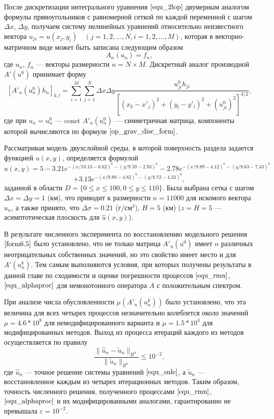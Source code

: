 После дискретизации интегрального уравнения $\eqref{equ_2lop}$ двумерным аналогом формулы прямоугольников с равномерной сеткой по каждой переменной с шагом $\Delta x$, $\Delta y$, получаем систему нелинейных уравнений относительно неизвестного вектора $u_{ji}=u(x_j,y_i)\quad (j=1,2,...,N, i=1,2,...,M)$, которая в векторно-матричном виде может быть записана следующим образом
\begin{equation}\label{equ_snle}
	A_n(u_n)=f_n,
\end{equation}
где $u_n$, $f_n$ --- векторы размерности $n=N\times M$. Дискретный аналог производной $A'(u^0)$ принимает форму
\begin{equation}\label{op_grav_disc_form}
	[A'_n(u_n^0)h_n]_{k,l}=\sum\limits_{i=1}^{M}\sum\limits_{j=1}^{N}
	\Delta x\Delta y\frac{u^0_{ji}h_{ji}}{[(x_k-x'_j)^2+(y_l-y'_i)^2+(u^0_{ji})^2]^{3/2}},
\end{equation}
где при $u_n=u_{n}^{0}$ --- const $A'_n(u_n^0)$ --- симметричная матрица, компоненты которой вычисляются по формуле $\eqref{op_grav_disc_form}$.

Рассматривая модель двухслойной среды, в которой поверхность раздела задается функцией $u(x,y)$, определяется формулой \cite{AkMisSkurTre2015_1}
$$
\hat{u}(x,y)=5-3.21e^{-(x/10.13-6.62)^6-(y/9.59-2.93)^6}-
2.78e^{-(x/9.89-4.12)^6-(y/8.63-7.43)^6}$$
\begin{equation}\label{form6.5}
+3.13e^{-(x/9.89-4.82)^6-(y/8.72-4.33)^6},
\end{equation}
заданной в области $D=\{0\le x\le 100, 0\le y \le 110\}$. Была выбрана сетка с шагом $\Delta x=\Delta y=1$ (км), что приводит к размерности $n=11000$ для искомого вектора $u_n$, а также принято, что $\Delta\sigma=0.21$ (г/см$^3$), $H=5$ (км) ($z=H=5$ --- асимптотическая плоскость для $\hat{u}(x,y)$).

В результате численного эксперимента по восстановлению модельного решения $\eqref{form6.5}$ было установлено, что не только матрица $A'_n(u^0)$ имеет $n$ различных неотрицательных собственных значений, но это свойство имеет место и для $A'(u_n^k)$. Тем самым выполняются условия, при которых получены результаты в данной главе по сходимости и оценке погрешности процессов $\eqref{equ_rmn}$, $\eqref{equ_alphaproc}$ для немонотонного оператора $A$ с положительным спектром. 

При анализе числа обусловленности $\mu(A'_n(u_n^k))$ было установлено, что эта величина для всех четырех процессов незначительно колеблется около значений $\mu=4.6 * 10^{8}$ для немодифицированного варианта и $\mu=1.5 * 10^{4}$ для модифицированных методов. Выход из процесса итераций каждого из методов осуществляется по правилу
\begin{equation}\label{cond6.6}
\frac{\|\hat{u}_n-\tilde{u}_n\|_{R^n}}{\|\tilde{u}_n\|_{R^n}}\le 10^{-2},
\end{equation}
где $\hat{u}_n$ --- точное решение системы уравнений $\eqref{equ_snle}$, а $\tilde{u}_n$ --- восстановленное каждым из четырех итерационных методов. Таким образом, точность численного решения, полученного процессами $\eqref{equ_rmn}$, $\eqref{equ_alphaproc}$ и их модифицированными аналогами, гарантированно не превышала $\varepsilon=10^{-2}$.

